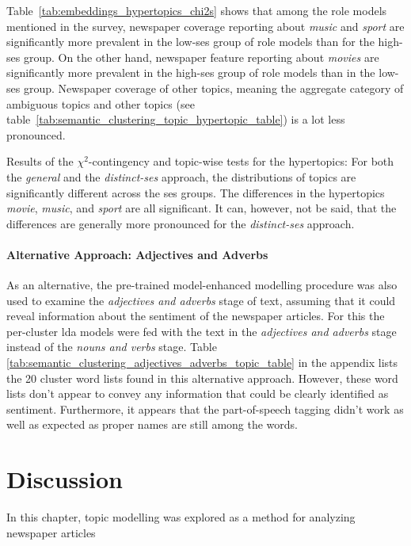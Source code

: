 Table~\ref{tab:embeddings_hypertopics_chi2s} shows that among the role models mentioned in the survey, newspaper coverage reporting about \textit{music} and \textit{sport} are significantly more prevalent in the low-\gls{ses} group of role models than for the high-\gls{ses} group. On the other hand, newspaper feature reporting about \textit{movies} are significantly more prevalent in the high-\gls{ses} group of role models than in the low-\gls{ses} group. Newspaper coverage of other topics, meaning the aggregate category of ambiguous topics and other topics (see table~\ref{tab:semantic_clustering_topic_hypertopic_table}) is a lot less pronounced.

\begin{table}
    \centering
    
    \caption{Results of the $\chi^2$-contingency and topic-wise tests for the hypertopics: For both the \textit{general} and the \textit{distinct-\gls{ses}} approach, the distributions of topics are significantly different across the \gls{ses} groups. The differences in the hypertopics \textit{movie}, \textit{music}, and \textit{sport} are all significant. It can, however, not be said, that the differences are generally more pronounced for the \textit{distinct-\gls{ses}} approach.}\label{tab:embeddings_hypertopics_chi2s}
\end{table}

\paragraph{Alternative Approach: Adjectives and Adverbs}
As an alternative, the pre-trained model-enhanced modelling procedure was also used to examine the \textit{adjectives and adverbs} stage of text, assuming that it could reveal information about the sentiment of the newspaper articles. For this the per-cluster \gls{lda} models were fed with the text in the \textit{adjectives and adverbs} stage instead of the \textit{nouns and verbs} stage. Table \ref{tab:semantic_clustering_adjectives_adverbs_topic_table} in the appendix lists the \SI{20}{} cluster word lists found in this alternative approach. However, these word lists don't appear to convey any information that could be clearly identified as sentiment. Furthermore, it appears that the part-of-speech tagging didn't work as well as expected as proper names are still among the words.


\section{Discussion}
In this chapter, topic modelling was explored as a method for analyzing newspaper articles
